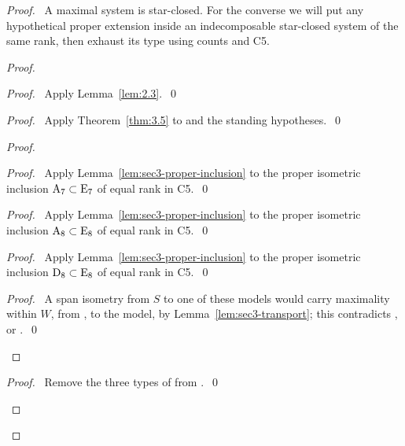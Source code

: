 \begin{proof}
 \pfsketch\ A maximal system is star-closed. For the converse we will put any
 hypothetical proper extension inside an indecomposable star-closed system of the
 same rank, then exhaust its type using counts and C5.
 \begin{proof}
  \begin{proof}\pf\ Apply Lemma~\ref{lem:2.3}.~\qed\end{proof}
  \begin{proof}\pf\ Apply Theorem~\ref{thm:3.5} to  and the standing hypotheses.~\qed\end{proof}
  \begin{proof}
   \begin{proof}\pf\ Apply Lemma~\ref{lem:sec3-proper-inclusion} to the proper
    isometric inclusion $\mathrm{A}_7\subset\mathrm{E}_7$ of equal rank in C5.~\qed\end{proof}
   \begin{proof}\pf\ Apply Lemma~\ref{lem:sec3-proper-inclusion} to the proper
    isometric inclusion $\mathrm{A}_8\subset\mathrm{E}_8$ of equal rank in C5.~\qed\end{proof}
   \begin{proof}\pf\ Apply Lemma~\ref{lem:sec3-proper-inclusion} to the proper
    isometric inclusion $\mathrm{D}_8\subset\mathrm{E}_8$ of equal rank in C5.~\qed\end{proof}
   \qedstep
   \begin{proof}\pf\ A span isometry from $S$ to one of these models would carry
    maximality within $W$, from , to the model, by
    Lemma~\ref{lem:sec3-transport}; this contradicts ,
     or .~\qed\end{proof}
  \end{proof}
  \qedstep
  \begin{proof}\pf\ Remove the three types of  from
   .~\qed\end{proof}
 \end{proof}

\end{proof}

